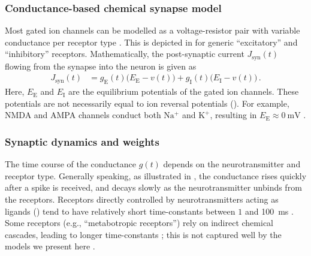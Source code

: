 \subsubsection{Conductance-based chemical synapse model}
Most gated ion channels can be modelled as a voltage-resistor pair with variable conductance per receptor type \citep{roth2009modeling}.
This is depicted in  for generic \enquote{excitatory} and \enquote{inhibitory} receptors.
Mathematically, the post-synaptic current $J_\mathrm{syn}(t)$ flowing from the synapse into the neuron is given as
\begin{align}
	J_\mathrm{syn}(t) &=
		  g_\mathrm{E}(t) \bigl(E_\mathrm{E} - v(t)\bigr)
		+ g_\mathrm{I}(t) \bigl(E_\mathrm{I} - v(t)\bigr) \,.
	\label{eqn:conductance_synapse}
\end{align}
Here, $E_\mathrm{E}$ and $E_\mathrm{I}$ are the equilibrium potentials of the gated ion channels.
These potentials are not necessarily equal to ion reversal potentials ().
For example, NMDA and AMPA channels conduct both $\mathrm{Na^+}$ and $\mathrm{K^+}$, resulting in $E_\mathrm{E} \approx \SI{0}{\milli\volt}$ \citep[Chapter~10]{kandel2012principles}.

\subsubsection{Synaptic dynamics and weights}
The time course of the conductance $g(t)$ depends on the neurotransmitter and receptor type.
Generally speaking, as illustrated in , the conductance rises quickly after a spike is received, and decays slowly as the neurotransmitter unbinds from the receptors.
Receptors directly controlled by neurotransmitters acting as ligands () tend to have relatively short time-constants between $1$ and \SI{100}{\milli\second} \citep{jones2014neurotransmitter}.
Some receptors (e.g., \enquote{metabotropic receptors}) rely on indirect chemical cascades, leading to longer time-constants \citep[Chapter~14]{meriney2019synaptic}; this is not captured well by the models we present here \citep{roth2009modeling}.

